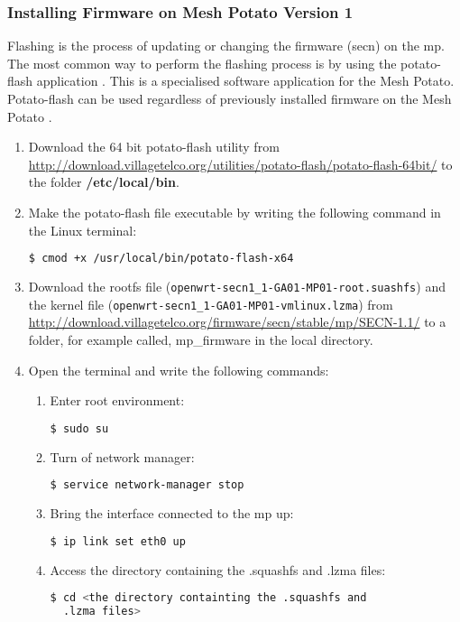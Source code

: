 \subsubsection{Installing Firmware on Mesh Potato Version 1}
Flashing is the process of updating or changing the firmware (\gls{secn}) on the \gls{mp}. The most common way to perform the flashing process is by using the potato-flash application \cite{flashing}. This is a specialised software application for the Mesh Potato. Potato-flash can be used regardless of previously installed firmware on the Mesh Potato \cite{InstallingSecnFirmware}. 

\begin{enumerate}
\item Download the 64 bit potato-flash utility from \url{http://download.villagetelco.org/utilities/potato-flash/potato-flash-64bit/} to the folder \textbf{/etc/local/bin}.
\item Make the potato-flash file executable by writing the following command in the Linux terminal:
\begin{lstlisting}[language=bash]
  $ cmod +x /usr/local/bin/potato-flash-x64
\end{lstlisting}
\item Download the rootfs file (\texttt{openwrt-secn1_1-GA01-MP01-root.suashfs}) and the kernel file (\texttt{openwrt-secn1_1-GA01-MP01-vmlinux.lzma})  from \url{http://download.villagetelco.org/firmware/secn/stable/mp/SECN-1.1/} to a folder, for example called, mp\_firmware in the local directory.
\item Open the terminal and write the following commands: 
\begin{enumerate}
\item Enter root environment:
\noindent
\begin{lstlisting}[language=bash]
  $ sudo su
\end{lstlisting}

\item Turn of network manager:
\noindent 
\begin{lstlisting}[language=bash]
  $ service network-manager stop
\end{lstlisting}

\item Bring the interface connected to the \gls{mp} up:
\noindent 
\begin{lstlisting}[language=bash]
  $ ip link set eth0 up
\end{lstlisting}

\item Access the directory containing the .squashfs and .lzma files:
\noindent 
\begin{lstlisting}[language=bash]
  $ cd <the directory containting the .squashfs and 
  .lzma files>
\end{lstlisting}


\end{enumerate}
\end{enumerate}
